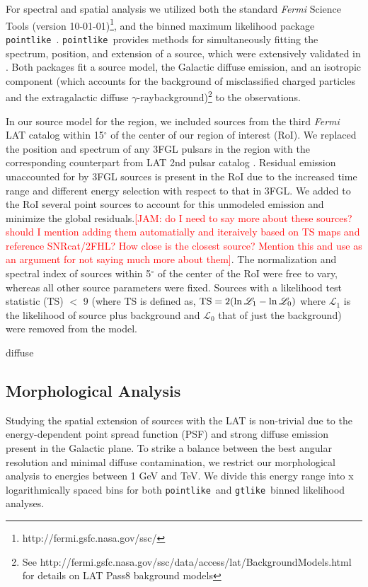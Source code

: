 \documentclass[preprint2]{aastex}
\newcommand{\kibitz}[2]{\ifnum\Comments=1\textcolor{#1}{#2}\fi}
\newcommand{\jamie}[1]{\kibitz{red}      {[JAM: #1]}}
\newcommand{\gam}{$\gamma$-ray}
\newcommand{\Fermi}{\emph{Fermi }}  %
\newcommand{\FermiLat}{\emph{Fermi} LAT }     %
\newcommand{\ptlike}{{\tt pointlike}}
\newcommand{\gtlike}{{\tt gtlike}}
\begin{document}
For spectral and spatial analysis we utilized both the standard \Fermi Science Tools (version 10-01-01)\footnote[1]{http://fermi.gsfc.nasa.gov/ssc/}, and the binned maximum likelihood package \ptlike~\citep{Kerr10}. \ptlike~provides methods for simultaneously fitting the spectrum, position, and extension of a source, which were extensively validated in \cite{Lande12}. Both packages fit a source model, the Galactic diffuse emission, and an isotropic component (which accounts for the background of misclassified charged particles and the extragalactic diffuse \gam background)\footnote[2]{See http://fermi.gsfc.nasa.gov/ssc/data/access/lat/BackgroundModels.html for details on LAT Pass8 bakground models} to the observations.

In our source model for the region, we included sources from the third \FermiLat catalog \citep[3FGL]{3FGL} within 15$^\circ$ of the center of our region of interest (RoI). We replaced the position and spectrum of any 3FGL pulsars in the region with the corresponding counterpart  from LAT 2nd pulsar catalog \citep{2PC}.  Residual emission unaccounted for by 3FGL sources is present in the RoI due to the increased time range and different energy selection with respect to that in 3FGL. We added to the RoI several point sources to account for this unmodeled emission and minimize the global residuals.\jamie{do I need to say more about these sources? should I mention adding them automatially and iteraively based on TS maps and reference SNRcat/2FHL? How close is the closest source? Mention this and use as an argument for not saying much more about them}.  The normalization and spectral index of sources within 5$^{\circ}$ of the center of the RoI were free to vary, whereas all other source parameters were fixed. Sources with a likelihood test statistic (TS) $<$ 9 (where TS is defined as, ${\rm TS}=2(\ln \mathcal{L}_1 - \ln \mathcal{L}_0)$ where $\mathcal{L}_1$ is the likelihood of source plus background and  $\mathcal{L}_0$ that of just the background) were removed from the model.  

diffuse

\subsection{\label{sec:LATmorph}Morphological Analysis}
Studying the spatial extension of sources with the LAT is non-trivial due to the energy-dependent point spread function (PSF) and strong diffuse emission present in the Galactic plane. To strike a balance between the best angular resolution and minimal diffuse contamination, we restrict our morphological analysis to energies between 1 GeV and  TeV. We divide this energy range into x logarithmically spaced bins for both \ptlike~and \gtlike~binned likelihood analyses.
\end{document}
